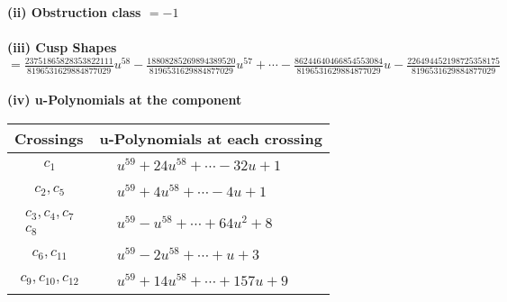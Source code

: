 \documentclass[1p]{elsarticle_modified}
\theoremstyle{definition}
\begin{document}
\flushleft \textbf{(ii) Obstruction class $= -1$}\\~\\
\flushleft \textbf{(iii) Cusp Shapes $= \frac{23751865828353822111}{8196531629884877029} u^{58}-\frac{18808285269894389520}{8196531629884877029} u^{57}+\cdots-\frac{86244640466854553084}{8196531629884877029} u-\frac{226494452198725358175}{8196531629884877029}$}\\~\\
\newpage\renewcommand{\arraystretch}{1}
\flushleft \textbf{(iv) u-Polynomials at the component}\newline \\
\begin{tabular}{m{50pt}|m{274pt}}
Crossings & \hspace{64pt}u-Polynomials at each crossing \\
\hline $$\begin{aligned}c_{1}\end{aligned}$$&$\begin{aligned}
&u^{59}+24 u^{58}+\cdots-32 u+1
\end{aligned}$\\
\hline $$\begin{aligned}c_{2},c_{5}\end{aligned}$$&$\begin{aligned}
&u^{59}+4 u^{58}+\cdots-4 u+1
\end{aligned}$\\
\hline $$\begin{aligned}c_{3},c_{4},c_{7}\\c_{8}\end{aligned}$$&$\begin{aligned}
&u^{59}- u^{58}+\cdots+64 u^2+8
\end{aligned}$\\
\hline $$\begin{aligned}c_{6},c_{11}\end{aligned}$$&$\begin{aligned}
&u^{59}-2 u^{58}+\cdots+u+3
\end{aligned}$\\
\hline $$\begin{aligned}c_{9},c_{10},c_{12}\end{aligned}$$&$\begin{aligned}
&u^{59}+14 u^{58}+\cdots+157 u+9
\end{aligned}$\\
\hline
\end{tabular}\\~\\
\end{document}
